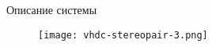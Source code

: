 \begin{frame}{Описание системы}
    \begin{figure}
        \texttt{[image: vhdc-stereopair-3.png]}
    \end{figure}
\end{frame}